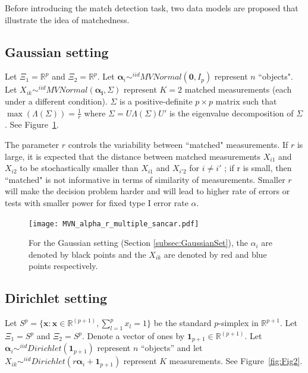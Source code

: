 \documentclass[12pt,oneside,final]{thesis}\usepackage[]{graphicx}\usepackage[]{color}
\begin{document}
  Before introducing the match detection task, two data models are proposed that illustrate the idea of matchedness.
\subsection{Gaussian setting\label{subsec:GaussianSet}}
  Let    $\Xi_1 = \mathbb{R}^{p}$ and $\Xi_2 = \mathbb{R}^{p}$.
  Let $\bm{\alpha}_i \sim^{iid} MVNormal(\bm{0},I_p)$ represent $n$ ``objects".  Let $X_{ik} \sim^{iid} MVNormal(\bm{\alpha_i},\Sigma)$ represent $K=2$ matched measurements (each under a different condition).
  $\Sigma$ is a positive-definite $p\times p$ matrix such that  $\max(\Lambda(\Sigma))=\frac{1}{r} $ where $\Sigma=U\Lambda(\Sigma)U'$  is the eigenvalue decomposition of $\Sigma$. See Figure~\ref{fig:Fig1}.

The parameter $r$ controls the variability between ``matched" measurements. If $r$ is large, it is expected that the distance between matched measurements
$X_{i1}$ and $X_{i2}$ to be stochastically smaller than $X_{i1}$ and $X_{i'2}$ for $i \neq i'$ ; if r is small, then ``matched" is not informative in terms of similarity of measurements.
 Smaller $r$ will make the decision problem harder and will lead to higher rate of errors or tests with smaller power for fixed type I error rate $\alpha$.
  
    \begin{figure}
	\begin{center}
    \texttt{[image: MVN\_alpha\_r\_multiple\_sancar.pdf]}
    \caption{For the  Gaussian setting (Section \ref{subsec:GaussianSet}), the $\alpha_i$ are denoted by black points and the $X_{ik}$ are denoted by red and blue points respectively.\label{fig:Fig1}}
	\end{center}
  \end{figure}

\subsection{Dirichlet setting\label{subsec:DirichletSet}}
Let $S^p=\{\bm{x}:\bm{x}\in\mathbb{R}^{(p+1)}, \sum_{l=1}^p{x_l}=1\}$ be the standard $p$-simplex in $\mathbb{R}^{p+1}$.
 Let $\Xi_1 = S^p$ and $\Xi_2 = S^p$.   Denote a vector of ones by $\bm{1}_{p+1}\in \mathbb{R}^{(p+1)}$.
  Let $\bm{\alpha}_i \sim^{iid} Dirichlet(\bm{1}_{p+1})$ represent $n$  ``objects'' and let $X_{ik} \sim^{iid} Dirichlet(r\bm{\alpha}_i+\bm{1}_{p+1})$ represent $K$ measurements. See Figure~\ref{fig:Fig2}.
\end{document}
